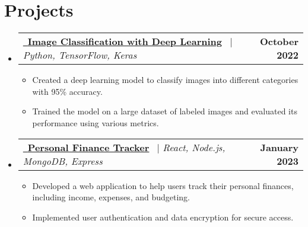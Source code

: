 \documentclass[letterpaper,11pt]{article}
\makeatletter
\newcommand{\resumeItem}[1]{
  \item\small{
    {#1 \vspace{-2pt}}
  }
}
\newcommand{\resumeProjectHeading}[2]{
    \item
    \begin{tabular*}{1.001\textwidth}{l@{\extracolsep{\fill}}r}
      \small#1 & \textbf{\small #2}\\
    \end{tabular*}\vspace{-7pt}
}
\newcommand{\resumeSubHeadingListStart}{\begin{itemize}[leftmargin=0.0in, label={}]}
\newcommand{\resumeSubHeadingListEnd}{\end{itemize}}
\newcommand{\resumeItemListStart}{\begin{itemize}}
\newcommand{\resumeItemListEnd}{\end{itemize}\vspace{-5pt}}
\makeatother
\begin{document}
\vspace{-20pt}

\section{Projects}
    \vspace{-5pt}
    \resumeSubHeadingListStart
    \resumeProjectHeading
          {\href{None}{\raisebox{-0.2\height}\ \underline{\textbf{Image Classification with Deep Learning}}}~ $|$ \emph{Python, TensorFlow, Keras}}{October 2022}
          \resumeItemListStart
            \resumeItem{Created a deep learning model to classify images into different categories with 95\% accuracy.}
            \resumeItem{Trained the model on a large dataset of labeled images and evaluated its performance using various metrics.}
                                  \resumeItemListEnd 
                              \vspace{-19pt}

    \resumeProjectHeading
        {\href{None}{\raisebox{-0.2\height}\ \underline{\textbf{Personal Finance Tracker}}}~ $|$ \emph{React, Node.js, MongoDB, Express}}{January 2023}
        \resumeItemListStart
        \resumeItem{Developed a web application to help users track their personal finances, including income, expenses, and budgeting.}
        \resumeItem{Implemented user authentication and data encryption for secure access.}
                        \resumeItemListEnd 
                    \vspace{-13pt}


          
      
       
    \resumeSubHeadingListEnd
\vspace{-15pt}
\end{document}
